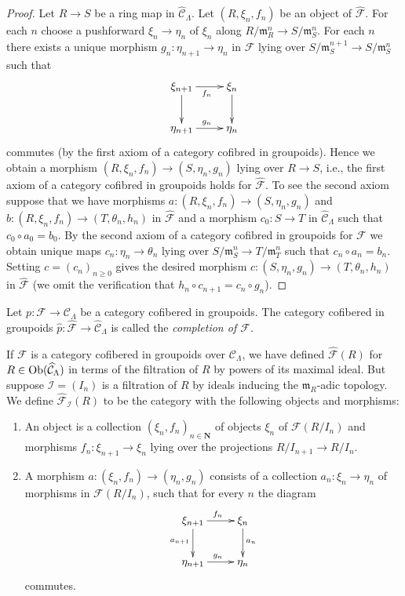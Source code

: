 \begin{proof}
Let $R \to S$ be a ring map in $\widehat{\mathcal{C}}_\Lambda$.
Let $(R, \xi_n, f_n)$ be an object of $\widehat{\mathcal{F}}$.
For each $n$ choose a pushforward $\xi_n \to \eta_n$ of $\xi_n$
along $R/\mathfrak m_R^n \to S/\mathfrak m_S^n$. For each $n$ there
exists a unique morphism $g_n : \eta_{n + 1} \to \eta_n$ in $\mathcal{F}$
lying over $S/\mathfrak m_S^{n + 1} \to S/\mathfrak m_S^n$ such that
$$
\xymatrix{
\xi_{n + 1} \ar[d] \ar[r]_{f_n} & \xi_n \ar[d] \\
\eta_{n + 1} \ar[r]^{g_n} & \eta_n
}
$$
commutes (by the first axiom of a category cofibred in groupoids).
Hence we obtain a morphism $(R, \xi_n, f_n) \to (S, \eta_n, g_n)$
lying over $R \to S$, i.e., the first axiom of a category cofibred in
groupoids holds for $\widehat{\mathcal{F}}$. To see the second axiom
suppose that we have morphisms
$a : (R, \xi_n, f_n) \to (S, \eta_n, g_n)$ and
$b : (R, \xi_n, f_n) \to (T, \theta_n, h_n)$ in $\widehat{\mathcal{F}}$
and a morphism $c_0 : S \to T$ in $\widehat{\mathcal{C}}_\Lambda$ such that
$c_0 \circ a_0 = b_0$. By the second axiom of a category cofibred in groupoids
for $\mathcal{F}$ we obtain unique maps $c_n : \eta_n \to \theta_n$
lying over $S/\mathfrak m_S^n \to T/\mathfrak m_T^n$ such that
$c_n \circ a_n = b_n$. Setting $c = (c_n)_{n \geq 0}$ gives the desired
morphism $c : (S, \eta_n, g_n) \to (T, \theta_n, h_n)$ in
$\widehat{\mathcal{F}}$ (we omit the verification that
$h_n \circ c_{n + 1} = c_n \circ g_n$).
\end{proof}

\begin{definition}
\label{definition-completion}
Let $p : \mathcal{F} \to \mathcal{C}_\Lambda$ be a category cofibered in
groupoids. The category cofibered in groupoids
$\widehat{p} : \widehat{\mathcal  F} \to \widehat{\mathcal{C}}_\Lambda$
is called the {\it completion of $\mathcal{F}$}.
\end{definition}

\noindent
If $\mathcal{F}$ is a category cofibered in groupoids over $\mathcal
C_\Lambda$, we have defined $\widehat{\mathcal{F}}(R)$ for $R \in
\mathop{\mathrm{Ob}}\nolimits(\widehat{\mathcal{C}}_\Lambda)$ in terms of the filtration of
$R$ by powers of its maximal ideal.  But suppose $\mathcal{I} = (I_n)$ is a
filtration of $R$ by ideals inducing the $\mathfrak{m}_R$-adic topology.  We
define $\widehat{\mathcal{F}}_\mathcal{I}(R)$ to be the category with the
following objects and morphisms:
\begin{enumerate}
\item An object is a collection $(\xi_n, f_n)_{n \in \mathbf{N}}$ of
objects $\xi_n$ of $\mathcal{F}(R/I_n)$ and morphisms
$f_n : \xi_{n + 1} \to \xi_n$ lying over the projections
$R/I_{n + 1} \to R/I_n$.
\item A morphism $a : (\xi_n, f_n) \to (\eta_n, g_n)$ consists of a
collection $a_n : \xi_n \to \eta_n$ of morphisms in
$\mathcal{F}(R/I_n)$, such that for every $n$ the diagram
$$
\xymatrix{
\xi_{n + 1} \ar[r]^{f_n} \ar[d]_{a_{n + 1}} & \xi_n \ar[d]^{a_n} \\
\eta_{n + 1} \ar[r]^{g_n} & \eta_n
}
$$
commutes.
\end{enumerate}

